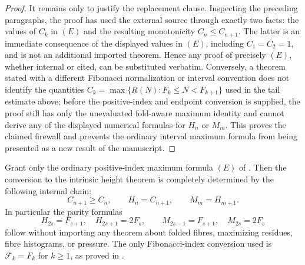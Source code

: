 \begin{proof}
It remains only to justify the replacement clause.  Inspecting the preceding
paragraphs, the proof has used the external source through exactly two facts:
the values of \(C_k\) in \((E)\) and the resulting monotonicity
\(C_n\le C_{n+1}\).  The latter is an immediate consequence of the displayed
values in \((E)\), including \(C_1=C_2=1\), and is not an additional imported
theorem.  Hence any proof of precisely \((E)\), whether internal or cited, can be
substituted verbatim.  Conversely, a theorem stated with a different Fibonacci
normalization or interval convention does not identify the quantities
\(C_k=\max\{R(N):F_k\le N<F_{k+1}\}\) used in the tail estimate above; before the
positive-index and endpoint conversion is supplied, the proof still has only the
unevaluated fold-aware maximum identity and cannot derive any of the displayed
numerical formulas for \(H_n\) or \(M_m\).  This proves the claimed firewall and
prevents the ordinary interval maximum formula from being presented as a new
result of the manuscript.
\end{proof}

\begin{theorem}
\label{thm:audited-shifted-half-interval-height-conversion}
Grant only the ordinary positive-index maximum formula \((E)\) of
.  Then the conversion to the
intrinsic height theorem is completely determined by the following internal
chain:
\[
  C_{n+1}\ge C_n,
  \qquad
  H_n=C_{n+1},
  \qquad
  M_m=H_{m+1}.
\]
In particular the parity formulas
\[
  H_{2s}=F_{s+1},\quad H_{2s+1}=2F_s,
  \qquad
  M_{2s-1}=F_{s+1},\quad M_{2s}=2F_s
\]
follow without importing any theorem about folded fibres, maximizing residues,
fibre histograms, or pressure.  The only Fibonacci-index conversion used is
\(\mathcal F_k=F_k\) for \(k\ge1\), as proved in
.
\end{theorem}

